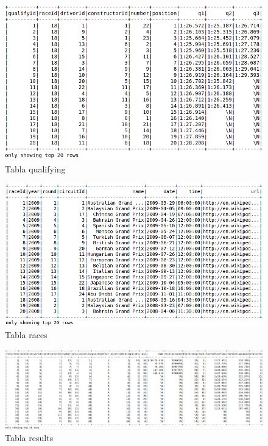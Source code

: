 \documentclass[12pt,twoside,titlepage]{report}
\begin{document}
\begin{figure}
  \includegraphics[scale=0.4]{qualifying_table.png}
  \centering
  \caption{Tabla qualifying}
  \label{fig:quali}
  \centering
\end{figure}

\begin{figure}
  \includegraphics[scale=0.4]{races_table.png}
  \centering
  \caption{Tabla races}
  \label{fig:races}
  \centering
\end{figure}

\begin{figure}
  \includegraphics[scale=0.27]{results_table.png}
  \centering
  \caption{Tabla results}
  \label{fig:resultstab}
  \centering
\end{figure}
\end{document}
